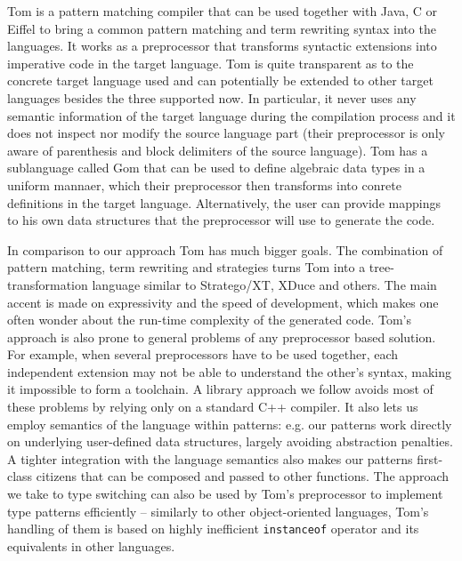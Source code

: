 \documentclass[preprint]{sigplanconf}
\makeatletter
\DeclareRobustCommand{\code}[1]{{\lstinline[breaklines=false,escapechar=@]{#1}}}
\makeatother
\begin{document}
Tom is a pattern matching compiler that can be used together with Java, C or 
Eiffel to bring a common pattern matching and term rewriting syntax into the 
languages\cite{Moreau:2003}. It works as a preprocessor that transforms 
syntactic extensions into imperative code in the target language. Tom is quite 
transparent as to the concrete target language used and can potentially be 
extended to other target languages besides the three supported now. In 
particular, it never uses any semantic information of the target language during 
the compilation process and it does not inspect nor modify the source language 
part (their preprocessor is only aware of parenthesis and block delimiters of 
the source language). Tom has a sublanguage called Gom that can be used to 
define algebraic data types in a uniform mannaer, which their preprocessor then 
transforms into conrete definitions in the target language. Alternatively, the 
user can provide mappings to his own data structures that the preprocessor will 
use to generate the code.

In comparison to our approach Tom has much bigger goals. The combination of 
pattern matching, term rewriting and strategies turns Tom into a 
tree-transformation language similar to Stratego/XT, XDuce and others. 
The main accent is made on expressivity and the speed of development, which 
makes one often wonder about the run-time complexity of the generated code.
Tom's approach is also prone to general problems of any preprocessor based 
solution\cite[]{SELL}. For example, when several preprocessors 
have to be used together, each independent extension may not be able to 
understand the other's syntax, making it impossible to form a toolchain.
A library approach we follow avoids most of these problems by relying only on a 
standard C++ compiler. It also lets us employ semantics of the language within 
patterns: e.g. our patterns work directly on underlying user-defined data 
structures, largely avoiding abstraction penalties. A tighter integration with 
the language semantics also makes our patterns first-class citizens that can be 
composed and passed to other functions. The approach we take to type switching 
can also be used by Tom's preprocessor to implement type patterns efficiently -- 
similarly to other object-oriented languages, Tom's handling of them is based on 
highly inefficient \code{instanceof} operator and its equivalents in other 
languages.

\end{document}
